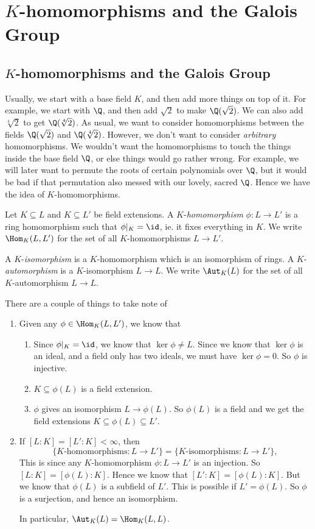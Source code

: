 \documentclass[a4paper]{article}
\begin{document}
\section{\texorpdfstring{$K$}{K}-homomorphisms and the Galois Group}
\subsection{\texorpdfstring{$K$}{K}-homomorphisms and the Galois Group}
Usually, we start with a base field $K$, and then add more things on top of it. For example, we start with $\Q$, and then add $\sqrt{2}$ to make $\Q(\sqrt{2})$. We can also add $\sqrt[4]{2}$ to get $\Q(\sqrt[4]{2})$. As usual, we want to consider homomorphisms between the fields $\Q(\sqrt{2})$ and $\Q(\sqrt[4]{2})$. However, we don't want to consider \emph{arbitrary} homomorphisms. We wouldn't want the homomorphisms to touch the things inside the base field $\Q$, or else things would go rather wrong. For example, we will later want to permute the roots of certain polynomials over $\Q$, but it would be bad if that permutation also messed with our lovely, sacred $\Q$. Hence we have the idea of $K$-homomorphisms.

\begin{defi}[$K$-homomorphism]
  Let $K\subseteq L$ and $K\subseteq L'$ be field extensions. A $K$-\emph{homomorphism} $\phi: L \to L'$ is a ring homomorphism such that $\phi|_K = \id$, ie. it fixes everything in $K$. We write $\Hom_K(L, L')$ for the set of all $K$-homomorphisms $L\to L'$.

  A $K$-\emph{isomorphism} is a $K$-homomorphism which is an isomorphism of rings. A $K$-\emph{automorphism} is a $K$-isomorphism $L\to L$. We write $\Aut_K(L)$ for the set of all $K$-automorphism $L\to L$.
\end{defi}
There are a couple of things to take note of
\begin{enumerate}
  \item Given any $\phi \in \Hom_K(L, L')$, we know that
    \begin{enumerate}
      \item Since $\phi|_K = \id$, we know that $\ker \phi \not= L$. Since we know that $\ker \phi$ is an ideal, and a field only has two ideals, we must have $\ker \phi = 0$. So $\phi$ is injective.
      \item $K\subseteq \phi(L)$ is a field extension.
      \item $\phi$ gives an isomorphism $L \to \phi(L)$. So $\phi(L)$ is a field and we get the field extensions $K\subseteq \phi(L) \subseteq L'$.
    \end{enumerate}
  \item If $[L:K] = [L':K] < \infty$, then
    \[
      \{K\text{-homomorphisms}: L \to L'\} = \{K\text{-isomorphisms}: L\to L'\},
    \]
    This is since any $K$-homomorphism $\phi: L\to L'$ is an injection. So $[L:K] = [\phi(L):K]$. Hence we know that $[L':K] = [\phi(L):K]$. But we know that $\phi(L)$ is a subfield of $L'$. This is possible if $L' = \phi(L)$. So $\phi$ is a surjection, and hence an isomorphism.

    In particular, $\Aut_K(L) = \Hom_K(L, L)$.
\end{enumerate}
\end{document}
